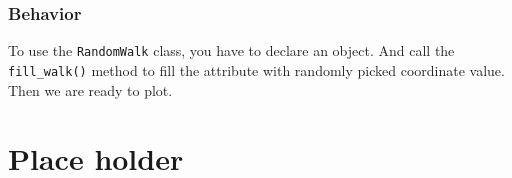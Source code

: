\documentclass[12pt]{book}
\begin{document}
\section{Behavior}
\label{sec:org1f5e165}
To use the \texttt{RandomWalk} class, you have to declare an object. And call the \texttt{fill\_walk()} method to fill the attribute with randomly picked coordinate value. Then we are ready to plot.

\part{Place holder}
\label{sec:org2a1aa3a}
\end{document}
